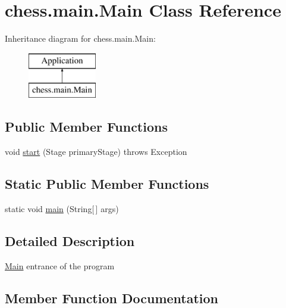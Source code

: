 \hypertarget{classchess_1_1main_1_1_main}{}\section{chess.\+main.\+Main Class Reference}
\label{classchess_1_1main_1_1_main}
Inheritance diagram for chess.\+main.\+Main\+:\begin{figure}[H]
\begin{center}
\leavevmode
\includegraphics[height=2.000000cm]{classchess_1_1main_1_1_main}
\end{center}
\end{figure}
\subsection*{Public Member Functions}
\begin{DoxyCompactItemize}
\item 
void \mbox{\hyperlink{classchess_1_1main_1_1_main_a673791d4659f12729827e8b279ac83f4}{start}} (Stage primary\+Stage)  throws Exception 
\end{DoxyCompactItemize}
\subsection*{Static Public Member Functions}
\begin{DoxyCompactItemize}
\item 
static void \mbox{\hyperlink{classchess_1_1main_1_1_main_abbdba23121a3431ae17f7df3ee577d10}{main}} (String\mbox{[}$\,$\mbox{]} args)
\end{DoxyCompactItemize}


\subsection{Detailed Description}
\mbox{\hyperlink{classchess_1_1main_1_1_main}{Main}} entrance of the program 

\subsection{Member Function Documentation}
\mbox{\label{classchess_1_1main_1_1_main_abbdba23121a3431ae17f7df3ee577d10}} 
